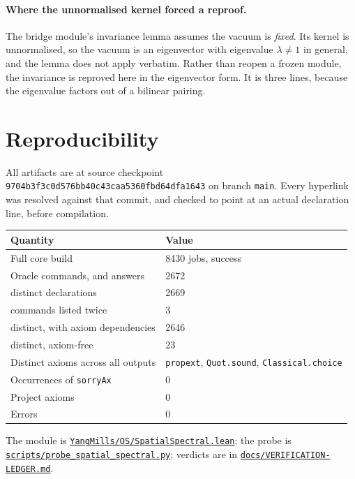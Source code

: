 \documentclass[11pt]{article}
\theoremstyle{definition}
\newcommand{\anchor}{9704b3f3c0d576bb40c43caa5360fbd64dfa1643}
\newcommand{\repofile}[2]{%
  \href{https://github.com/lluiseriksson/THE-ERIKSSON-PROGRAMME/blob/\anchor/#1}{\nolinkurl{#2}}}
\begin{document}
\paragraph{Where the unnormalised kernel forced a reproof.}  The bridge module's
invariance lemma assumes the vacuum is \emph{fixed}.  Its kernel is
unnormalised, so the vacuum is an eigenvector with eigenvalue $\lambda\neq1$ in
general, and the lemma does not apply verbatim.  Rather than reopen a frozen
module, the invariance is reproved here in the eigenvector form.  It is three
lines, because the eigenvalue factors out of a bilinear pairing.

\section{Reproducibility}\label{sec:repro}

All artifacts are at source checkpoint \texttt{\anchor} on branch \texttt{main}.
Every hyperlink was resolved against that commit, and checked to point at an
actual declaration line, before compilation.

\begin{center}
\begin{tabular}{ll}
\toprule
Quantity & Value \\
\midrule
Full core build & 8430 jobs, success \\
Oracle commands, and answers & 2672 \\
\quad distinct declarations & 2669 \\
\quad commands listed twice & 3 \\
\quad distinct, with axiom dependencies & 2646 \\
\quad distinct, axiom-free & 23 \\
Distinct axioms across all outputs & \texttt{propext}, \texttt{Quot.sound}, \texttt{Classical.choice} \\
Occurrences of \texttt{sorryAx} & 0 \\
Project axioms & 0 \\
Errors & 0 \\
\bottomrule
\end{tabular}
\end{center}

The module is
\repofile{YangMills/OS/SpatialSpectral.lean}{YangMills/OS/SpatialSpectral.lean};
the probe is
\repofile{scripts/probe\_spatial\_spectral.py}{scripts/probe\_spatial\_spectral.py};
verdicts are in
\repofile{docs/VERIFICATION-LEDGER.md}{docs/VERIFICATION-LEDGER.md}.
\end{document}
